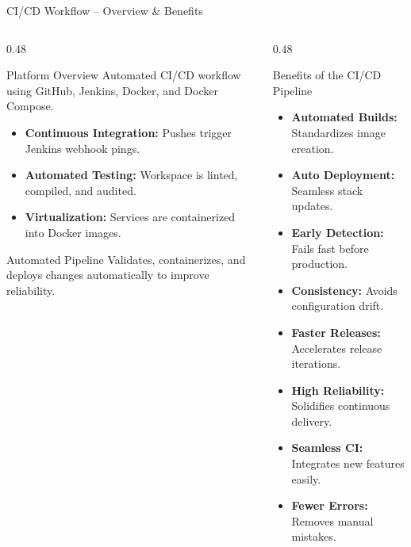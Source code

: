 \documentclass[aspectratio=169, 10pt]{beamer}
\begin{document}
\begin{frame}{CI/CD Workflow -- Overview \& Benefits}
  \begin{columns}[T]
    \begin{column}{0.48\textwidth}
      \begin{scard}{Platform Overview}
        Automated CI/CD workflow using GitHub, Jenkins, Docker, and Docker Compose.
        \begin{itemize}\setlength{\itemsep}{0.5pt}
          \item \textbf{Continuous Integration:} Pushes trigger Jenkins webhook pings.
          \item \textbf{Automated Testing:} Workspace is linted, compiled, and audited.
          \item \textbf{Virtualization:} Services are containerized into Docker images.
        \end{itemize}
      \end{scard}
      \vspace{0.5mm}
      \begin{infobox}{Automated Pipeline}
        Validates, containerizes, and deploys changes automatically to improve reliability.
      \end{infobox}
    \end{column}
    \begin{column}{0.48\textwidth}
      \begin{successbox}{Benefits of the CI/CD Pipeline}
        \begin{itemize}\setlength{\itemsep}{-1.0pt}
          \item[\faCheck] \textbf{Automated Builds:} Standardizes image creation.
          \item[\faCheck] \textbf{Auto Deployment:} Seamless stack updates.
          \item[\faCheck] \textbf{Early Detection:} Fails fast before production.
          \item[\faCheck] \textbf{Consistency:} Avoids configuration drift.
          \item[\faCheck] \textbf{Faster Releases:} Accelerates release iterations.
          \item[\faCheck] \textbf{High Reliability:} Solidifies continuous delivery.
          \item[\faCheck] \textbf{Seamless CI:} Integrates new features easily.
          \item[\faCheck] \textbf{Fewer Errors:} Removes manual mistakes.
        \end{itemize}
      \end{successbox}
    \end{column}
  \end{columns}
\end{frame}
\end{document}
